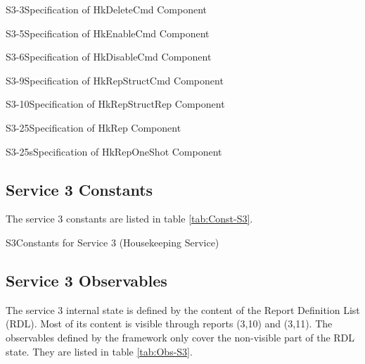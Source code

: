 \documentclass[a4paper,10pt]{article}
\newenvironment{cr_cmd}[2]
{
\begin{longtable}{|p{3cm}|p{9.6cm}|}
\caption{#2} \label{tab:CR-#1} \\
\hline
\rowcolor{light-gray}
\DTLforeach*{dbCmd}{\att=Attribute,\attValue=#1}
{\DTLiffirstrow{}{\\\hline}\att & \attValue}\\\hline
}
{\end{longtable}}
\newenvironment{cr_rep}[2]
{
\begin{longtable}{|c|p{10cm}|}
\caption{#2} \label{tab:CR-#1}\\
\hline
\rowcolor{light-gray}
\DTLforeach*{dbRep}{\att=Attribute,\attValue=#1}
{\DTLiffirstrow{}{\\\hline}\att & \attValue}\\\hline
}
{\end{longtable}}
\newenvironment{cr_const}[2]
{
\begin{longtable}{|l|p{9.5cm}|}
\caption{#2}\label{tab:Const-#1} \\
\hline
\rowcolor{light-gray}
\textbf{Name} & \textbf{Description}\\
\hline\hline
\endfirsthead
\rowcolor{light-gray}
\textbf{Name} & \textbf{Description}\\
\hline\hline
\endhead
\DTLforeach*[\DTLiseq{\cat}{#1}]{dbConst}{\cat=Category,\name=Name,\desc=Desc}
{\DTLiffirstrow{}{\\\hline}\texttt{\name} & \desc}\\\hline
}
{\end{longtable}}
\begin{document}
\begin{cr_cmd}{S3-3}{Specification of HkDeleteCmd Component}
\end{cr_cmd}

\newpage
\begin{cr_cmd}{S3-5}{Specification of HkEnableCmd Component}
\end{cr_cmd}

\begin{cr_cmd}{S3-6}{Specification of HkDisableCmd Component}
\end{cr_cmd}

\newpage
\begin{cr_cmd}{S3-9}{Specification of HkRepStructCmd Component}
\end{cr_cmd}

\begin{cr_rep}{S3-10}{Specification of HkRepStructRep Component}
\end{cr_rep}

\newpage
\begin{cr_rep}{S3-25}{Specification of HkRep Component}
\end{cr_rep}

\begin{cr_rep}{S3-25s}{Specification of HkRepOneShot Component}
\end{cr_rep}

\newpage 
\subsection{Service 3 Constants}\label{sec:serv3Const}
The service 3 constants are listed in table \ref{tab:Const-S3}.

\begin{cr_const}{S3}{Constants for Service 3 (Housekeeping Service)}
\end{cr_const}


\subsection{Service 3 Observables}\label{sec:serv3Obs}
The service 3 internal state is defined by the content of the Report Definition List (RDL). Most of its content is visible through reports (3,10) and (3,11). The observables defined by the framework only cover the non-visible part of the RDL state. They are listed in table \ref{tab:Obs-S3}.
\end{document}
